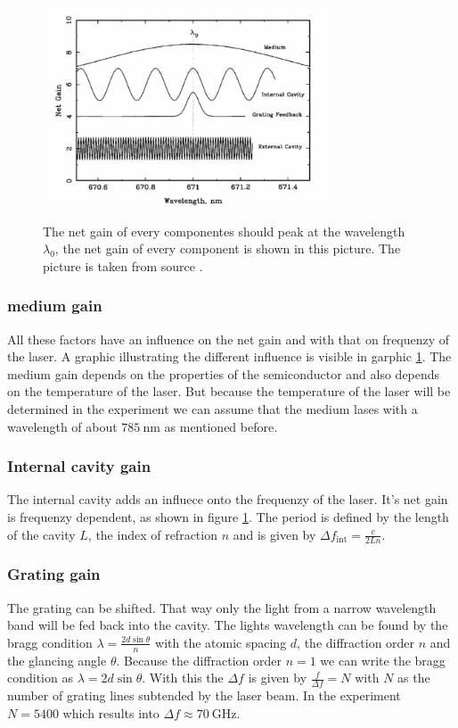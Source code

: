 \begin{figure}
    \centering
    \caption{The net gain of every componentes should peak at the wavelength $\lambda_0$, the net gain of every component is shown in this picture. The picture is taken from source \cite[6]{anleitung_laser}.}
    \includegraphics[width=0.75\textwidth]{content/data/netgain}
    \label{fig:netgain}
\end{figure}
\FloatBarrier
\subsubsection{medium gain}
All these factors have an influence on the net gain and with that on frequenzy of the laser.
A graphic illustrating the different influence is visible in garphic \ref{fig:netgain}.
The medium gain depends on the properties of the semiconductor and also depends on the temperature of the laser.
But because the temperature of the laser will be determined in the experiment we can assume that the medium lases with a wavelength of about $\SI{785}{\nano\meter}$ as mentioned before.

\subsubsection{Internal cavity gain}
The internal cavity adds an influece onto the frequenzy of the laser.
It's net gain is frequenzy dependent, as shown in figure \ref{fig:netgain}.
The period is defined by the length of the cavity $L$, the index of refraction $n$ and is given by
$\Delta f_\text{int} = \frac{c}{2Ln}$.

\subsubsection{Grating gain}
The grating can be shifted.
That way only the light from a narrow wavelength band will be fed back into the cavity.
The lights wavelength can be found by the bragg condition $\lambda = \frac{2d \sin{\theta}}{n}$ with the atomic spacing $d$, the diffraction order $n$ and the glancing angle $\theta$.
Because the diffraction order $n = 1$ we can write the bragg condition as $\lambda = 2d\sin{\theta}$.
With this the $\Delta f$ is given by $\frac{f}{\Delta f} = N$ with $N$ as the number of grating lines subtended by the laser beam.
In the experiment $N=5400$ which results into $\Delta f \approx \SI{70}{\giga\Hz}$.

